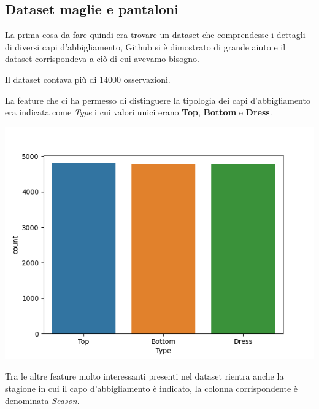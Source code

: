 \documentclass[a4paper, 11pt, oneside]{report}
\begin{document}
                \subsection{Dataset maglie e pantaloni}
                La prima cosa da fare quindi era trovare un dataset che comprendesse i dettagli di diversi capi d'abbigliamento,
                Github si è dimostrato di grande aiuto e il dataset \cite{6} corrispondeva a ciò di cui avevamo bisogno.
                \\
                \par \noindent Il dataset contava più di $14000$ osservazioni.
                \\
                \par \noindent La feature che ci ha permesso di distinguere la tipologia dei capi d'abbigliamento
                era indicata come \textit{Type} i cui valori unici erano \textbf{Top}, \textbf{Bottom} e \textbf{Dress}.
                \begin{center}
                    \includegraphics[scale=0.4]{countTopBottom}
                \end{center}
                \bigskip
                \par \noindent Tra le altre feature molto interessanti presenti nel dataset rientra anche la stagione
                in cui il capo d'abbigliamento è indicato, la colonna corrispondente è denominata \textit{Season}.
\end{document}
